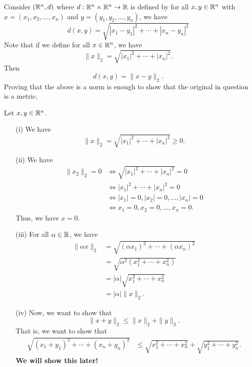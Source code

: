 \documentclass[a4paper]{report}
\begin{document}
\begin{eg}
    Consider \( (\mathbb{R}^{n}, d) \) where \( d: \mathbb{R}^{n} \times \mathbb{R}^{n} \to \mathbb{R} \) is defined by 
    for all \( x,y \in \mathbb{R}^{n} \) with \( x = ({x}_{1}, {x}_{2}, \dots, {x}_{n}) \) and \( y = ({y}_{1}, {y}_{2}, \dots, {y}_{n}) \), we have 
    \[  d(x,y) = \sqrt{ | {x}_{1} - {y}_{1} |^{2} + \cdots + | {x}_{n} - {y}_{n} |^{2} }  \]
Note that if we define for all \( x \in \mathbb{R}^{n} \), we have
\[  \|x \|_2 = \sqrt{ | {x}_{1} |^{2} + \cdots + | {x}_{n} |^{2} }.   \]
Then 
\[  d(x,y) = \| x - y\|_2. \]
Proving that the above is a norm is enough to show that the original in question is a metric.  

Let \( x,y \in \mathbb{R}^{n} \).

\begin{enumerate}
    \item[(i)] We have 
        \[  \|x \|_2 = \sqrt{ | {x}_{1} |^{2} + \cdots + | {x}_{n} |^{2}  }  \geq 0. \]
    \item[(ii)] We have 
        \begin{align*}
\|{x}_{2} \|_2 = 0 &\iff \sqrt{ | {x}_{1} |^{2} + \cdots + | {x}_{n} |^{2}  }  = 0  \\
                   &\iff | {x}_{1} |^{2} + \cdots + | {x}_{n} |^{2} = 0 \\ 
                   &\iff |  {x}_{1} |  = 0, | {x}_{2} | = 0, \dots,  | {x}_{n} |  = 0 \\
                   &\iff {x}_{1} = 0, {x}_{2} = 0, \dots, {x}_{n} = 0. 
        \end{align*}
        Thus, we have \( x = 0  \).
    \item[(iii)] For all \( \alpha \in \mathbb{R}  \), we have
        \begin{align*}
            \| \alpha x  \|_2 &= \sqrt{ (\alpha {x}_{1})^{2} + \cdots + (\alpha {x}_{n})^{2}  }  \\
                            &= \sqrt{ \alpha^{2} ({x}_{1}^{2} + \cdots + {x}_{n}^{2}) } \\
                            &= | \alpha |  \sqrt{ {x}_{1}^{2} + \cdots + {x}_{n}^{2} }  \\
                            &= | \alpha | \| x\|_2.
        \end{align*}
    \item[(iv)] Now, we want to show that 
        \[  \|x + y\|_2 \leq \| x\|_2 + \|y\|_2.   \]
        That is, we want to show that
        \begin{align*}
            \sqrt{ ({x}_{1} + {y}_{1})^{2} + \cdots + ({x}_{n} + {y}_{n})^{2} } &\leq \sqrt{ {x}_{1}^{2} + \cdots + {x}_{n}^{2} }  + \sqrt{ {y}_{1}^{2} + \cdots + {y}_{n}^{2} }.
        \end{align*}
        \textbf{We will show this later!}
\end{enumerate}
\end{eg}
\end{document}
